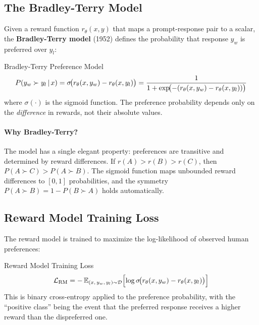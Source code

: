 \subsection{The Bradley-Terry Model}

Given a reward function $r_\theta(x, y)$ that maps a prompt-response pair
to a scalar, the \textbf{Bradley-Terry model} (1952) defines the
probability that response $y_w$ is preferred over $y_l$:

\begin{mathresult}{Bradley-Terry Preference Model}
\begin{equation}
P(y_w \succ y_l \,|\, x)
= \sigma\!\bigl(r_\theta(x, y_w) - r_\theta(x, y_l)\bigr)
= \frac{1}{1 + \exp\!\bigl(-(r_\theta(x, y_w) - r_\theta(x, y_l))\bigr)}
\label{eq:bradley_terry}
\end{equation}
where $\sigma(\cdot)$ is the sigmoid function.  The preference probability
depends only on the \emph{difference} in rewards, not their absolute values.
\end{mathresult}

\paragraph{Why Bradley-Terry?}
The model has a single elegant property: preferences are transitive and
determined by reward differences.  If $r(A) > r(B) > r(C)$, then
$P(A \succ C) > P(A \succ B)$.  The sigmoid function maps unbounded reward
differences to $[0, 1]$ probabilities, and the symmetry
$P(A \succ B) = 1 - P(B \succ A)$ holds automatically.

\subsection{Reward Model Training Loss}

The reward model is trained to maximize the log-likelihood of observed human
preferences:

\begin{mathresult}{Reward Model Training Loss}
\begin{equation}
\mathcal{L}_{\text{RM}} = -\operatorname{\mathbb{E}}_{(x,\, y_w,\, y_l) \sim \mathcal{D}}
\Bigl[\log \sigma\!\bigl(r_\theta(x, y_w) - r_\theta(x, y_l)\bigr)\Bigr]
\label{eq:rm_loss}
\end{equation}
This is binary cross-entropy applied to the preference probability, with the
``positive class'' being the event that the preferred response receives a
higher reward than the dispreferred one.
\end{mathresult}

